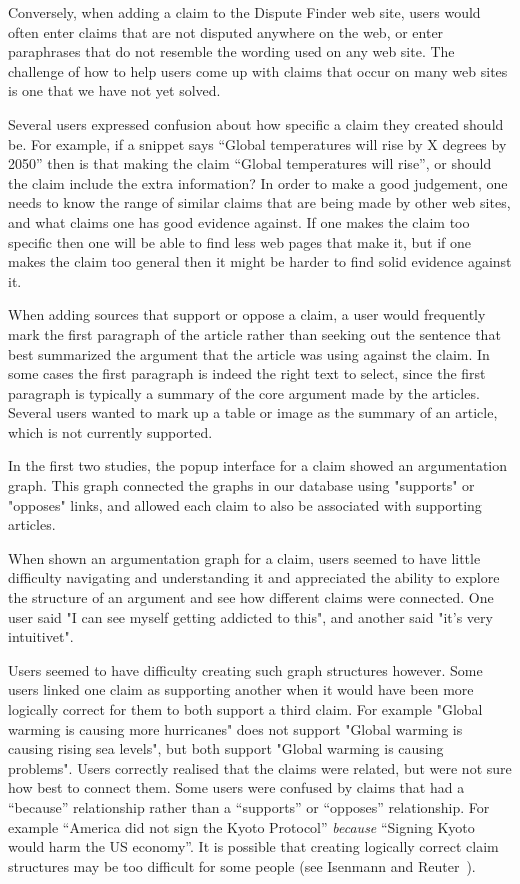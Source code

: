 \documentclass{www2010-submission}
\begin{document}
Conversely, when adding a claim to the Dispute Finder web site, users would often enter claims that are not disputed anywhere on the web, or enter paraphrases that do not resemble the wording used on any web site. The challenge of how to help users come up with claims that occur on many web sites is one that we have not yet solved.

Several users expressed confusion about how specific a claim they created should be. For example, if a snippet says ``Global temperatures will rise by X degrees by 2050'' then is that making the claim ``Global temperatures will rise'', or should the claim include the extra information? In order to make a good judgement, one needs to know the range of similar claims that are being made by other web sites, and what claims one has good evidence against. If one makes the claim too specific then one will be able to find less web pages that make it, but if one makes the claim too general then it might be harder to find solid evidence against it.

When adding sources that support or oppose a claim, a user would frequently mark the first paragraph of the article rather than seeking out the sentence that best summarized the argument that the article was using against the claim. In some cases the first paragraph is indeed the right text to select, since the first paragraph is typically a summary of the core argument made by the articles. Several users wanted to mark up a table or image as the summary of an article, which is not currently supported.

In the first two studies, the popup interface for a claim showed an argumentation graph. This graph connected the graphs in our database using "supports" or "opposes" links, and allowed each claim to also be associated with supporting articles. 

When shown an argumentation graph for a claim, users seemed to have little difficulty navigating and understanding it and appreciated the ability to explore the structure of an argument and see how different claims were connected. One user said "I can see myself getting addicted to this", and another said "it's very intuitivet".

Users seemed to have difficulty creating such graph structures however. Some users linked one claim as supporting another when it would have been more logically correct for them to both support a third claim. For example "Global warming is causing more hurricanes" does not support "Global warming is causing rising sea levels", but both support "Global warming is causing problems". Users correctly realised that the claims were related, but were not sure how best to connect them. Some users were confused by claims that had a ``because'' relationship rather than a ``supports'' or ``opposes'' relationship. For example ``America did not sign the Kyoto Protocol'' {\it because} ``Signing Kyoto would harm the US economy''.  It is possible that creating logically correct claim structures may be too difficult for some people (see Isenmann and Reuter~\cite{Isenmann1997}).
\end{document}
